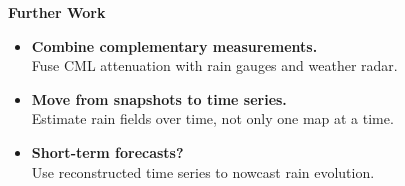 \documentclass[aspectratio=169]{beamer}
\begin{document}
\begin{frame}[plain]
    \vspace{-0.5mm}
    \begin{center}\large\bfseries Further Work\end{center}
    \vspace{7mm}

    \begin{itemize}
        \setlength{\itemsep}{4mm}
        \item \textbf{Combine complementary measurements.}\\
              Fuse CML attenuation with rain gauges and weather radar.

        \item \textbf{Move from snapshots to time series.}\\
              Estimate rain fields over time, not only one map at a time.

        \item \textbf{Short-term forecasts?}\\
              Use reconstructed time series to nowcast rain evolution.
    \end{itemize}
\end{frame}

\end{document}
